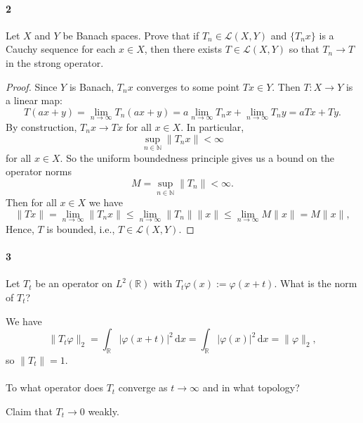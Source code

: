 \documentclass[12pt]{article}
\newlength{\myparskip}
\newenvironment{fullbox}{\begin{lrbox}{\savefullbox}\begin{minipage}{\dimexpr\textwidth-2\fboxsep\relax}\setlength{\parskip}{\myparskip}}{\end{minipage}\end{lrbox}\framebox[\textwidth]{\usebox{\savefullbox}}}
\newenvironment{pbox}[1][]{\begin{fullbox}\def\temp{#1}\ifx\temp\empty\else\paragraph{#1}\phantom{}\fi}{\end{fullbox}}
\theoremstyle{definition}
\newcommand{\N}{\mathbb{N}}
\newcommand{\R}{\mathbb{R}}
\renewcommand{\phi}{\varphi}
\newcommand{\<}{\langle}
\renewcommand{\>}{\rangle}
\newcommand{\dd}{\mathrm{d}}
\newcommand{\LL}{\mathcal{L}}
\begin{document}
\newpage

\begin{pbox}[2]
    Let $X$ and $Y$ be Banach spaces.
    Prove that if $T_n \in \LL(X, Y)$ and $\{T_n x\}$ is a Cauchy sequence for each $x \in X$, then there exists $T \in \LL(X, Y)$ so that $T_n \to T$ in the strong operator.
\end{pbox}

\begin{proof}
    Since $Y$ is Banach, $T_nx$ converges to some point $Tx \in Y$.
    Then $T : X \to Y$ is a linear map:
    \[
        T(ax + y)
            = \lim_{n \to \infty} T_n(ax + y)
            = a\lim_{n\to \infty} T_nx + \lim_{n \to \infty} T_ny
            = aTx + Ty.
    \]
    By construction, $T_nx \to Tx$ for all $x \in X$.
    In particular,
    \[
        \sup_{n \in \N}\|T_nx\| < \infty
    \]
    for all $x \in X$.
    So the uniform boundedness principle gives us a bound on the operator norms
    \[
        M = \sup_{n\in\N}\|T_n\| < \infty.
    \]
    Then for all $x \in X$ we have
    \[
        \|Tx\|
            = \lim_{n \to \infty} \|T_nx\|
            \leq \lim_{n \to \infty} \|T_n\|\|x\|
            \leq \lim_{n \to \infty} M\|x\|
            = M\|x\|,
    \]
    Hence, $T$ is bounded, i.e., $T \in \LL(X, Y)$.
\end{proof}


\newpage

\begin{pbox}[3]
    Let $T_t$ be an operator on $L^2(\R)$ with $T_t\phi(x) := \phi(x + t)$.
    What is the norm of $T_t$?
\end{pbox}

We have
\[
    \|T_t\phi\|_2
        = \int_\R |\phi(x+t)|^2 \,\dd{x}
        = \int_\R |\phi(x)|^2 \,\dd{x}
        = \|\phi\|_2,
\]
so $\|T_t\| = 1$.


\begin{pbox}
    To what operator does $T_t$ converge as $t \to \infty$ and in what topology?
\end{pbox}

Claim that $T_t \to 0$ weakly.
\end{document}
